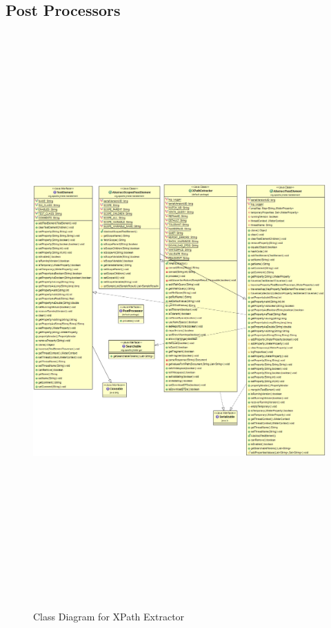 \documentclass[12pt]{book}
\begin{document}
  \subsection{Post Processors}
  \begin{figure}[H]
   \centering
   \includegraphics[width=17cm, height=22cm]{images/postprocessor_xpath}
   \caption{Class Diagram for XPath Extractor\label{fig:fig8_JMeter}}
  \end{figure}
  
\end{document}
